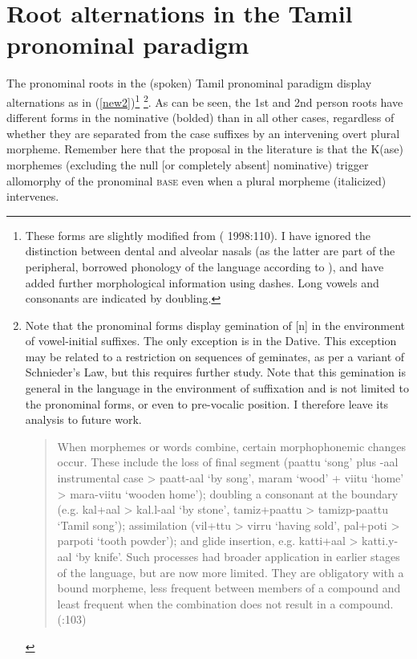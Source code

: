 \documentclass[output=paper,colorlinks,citecolor=brown,
]{langscibook}
\begin{document}
\section{Root alternations in the Tamil pronominal paradigm}

The pronominal roots in the (spoken) Tamil pronominal paradigm display alternations as in (\ref{new2})\footnote{These forms are slightly modified from (\citealt{steever2019dravidian} 1998:110). I have ignored the distinction between dental and alveolar nasals (as the latter are part of the peripheral, borrowed phonology of the language according to \citeauthor{steever2019dravidian}), and have added further morphological information using dashes. Long vowels and consonants are indicated by doubling.} \footnote{Note that the pronominal forms display gemination of [n] in the environment of vowel-initial suffixes. The only exception is in the Dative. This exception may be related to a restriction on sequences of geminates, as per a variant of Schnieder’s Law, but this requires further study. Note that this gemination is general in the language in the environment of suffixation and is not limited to the pronominal forms, or even to pre-vocalic position. I therefore leave its analysis to future work. \begin{quote}
When morphemes or words combine, certain morphophonemic changes occur. These include the loss of final segment (paattu ‘song’ plus -aal instrumental case > paatt-aal ‘by song’, maram ‘wood’ + viitu ‘home’ > mara-viitu ‘wooden home’); doubling a consonant at the boundary (e.g. kal+aal > kal.l-aal ‘by stone’, tamiz+paattu > tamizp-paattu ‘Tamil song’); assimilation (vil+ttu > virru ‘having sold’, pal+poti > parpoti ‘tooth powder’); and glide insertion, e.g. katti+aal > katti.y-aal ‘by knife’. Such processes had broader application in earlier stages of the language, but are now more limited. They are obligatory with a bound morpheme, less frequent between members of a compound and least frequent when the combination does not result in a compound. (\citealt{steever2019dravidian}:103) \end{quote}
}. As can be seen, the 1st and 2nd person roots have different forms in the nominative (bolded) than in all other cases, regardless of whether they are separated from the case suffixes by an intervening overt plural morpheme. Remember here that the proposal in the literature is that the K(ase) morphemes (excluding the null [or completely absent] nominative) trigger allomorphy of the pronominal \textsc{base} even when a plural morpheme (italicized) intervenes.
\end{document}
